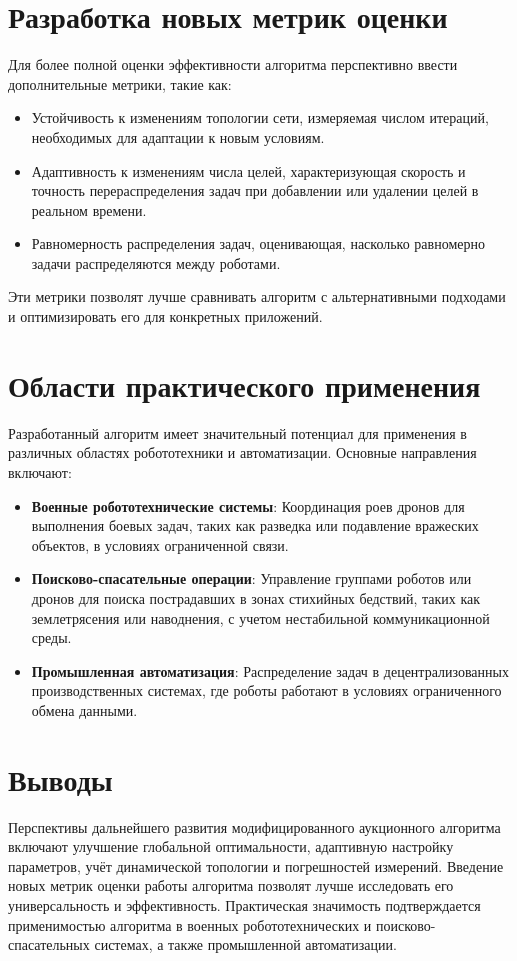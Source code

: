 \section{Разработка новых метрик оценки}
Для более полной оценки эффективности алгоритма перспективно ввести дополнительные метрики, такие как:
\begin{itemize}
    \item Устойчивость к изменениям топологии сети, измеряемая числом итераций, необходимых для адаптации к новым условиям.
    \item Адаптивность к изменениям числа целей, характеризующая скорость и точность перераспределения задач при добавлении или удалении целей в реальном времени.
    \item Равномерность распределения задач, оценивающая, насколько равномерно задачи распределяются между роботами.
\end{itemize}
Эти метрики позволят лучше сравнивать алгоритм с альтернативными подходами и оптимизировать его для конкретных приложений.

\section{Области практического применения}
Разработанный алгоритм имеет значительный потенциал для применения в различных областях робототехники и автоматизации. Основные направления включают:
\begin{itemize}
	\item \textbf{Военные робототехнические системы}: Координация роев дронов для выполнения боевых задач, таких как разведка или подавление вражеских объектов, в условиях ограниченной связи.
	\item \textbf{Поисково-спасательные операции}: Управление группами роботов или дронов для поиска пострадавших в зонах стихийных бедствий, таких как землетрясения или наводнения, с учетом нестабильной коммуникационной среды.
	\item \textbf{Промышленная автоматизация}: Распределение задач в децентрализованных производственных системах, где роботы работают в условиях ограниченного обмена данными.
\end{itemize}

\section{Выводы}
Перспективы дальнейшего развития модифицированного аукционного алгоритма включают улучшение глобальной оптимальности, адаптивную настройку параметров, учёт динамической топологии и погрешностей измерений. Введение новых метрик оценки работы алгоритма позволят лучше исследовать его универсальность и эффективность. Практическая значимость подтверждается применимостью алгоритма в военных робототехнических и поисково-спасательных системах, а также промышленной автоматизации.